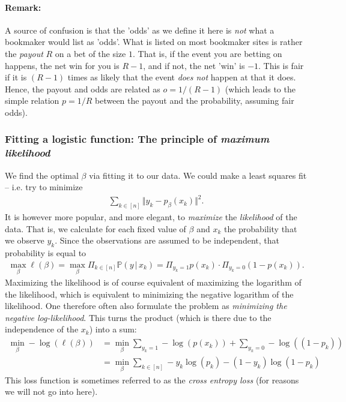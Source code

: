 \documentclass{article}
\newcommand{\norm}[1]{\Vert #1 \Vert}
\begin{document}
\paragraph{Remark:} A source of confusion is that the 'odds' as we define it here is \emph{not} what a bookmaker would list as 'odds'. What is listed on most bookmaker sites is rather the \emph{payout} $R$ on a bet of the size $1$. That is, if the event you are betting on happens, the net win for you is $R-1$, and if not, the net 'win' is $-1$. This is fair if it is $(R-1)$ times as likely that the event \emph{does not} happen at that it does. Hence, the payout and odds are related as $o=1/(R-1)$ (which leads to the simple relation $p=1/R$ between the payout and the probability, assuming fair odds).


\subsubsection{Fitting a logistic function: The principle of \emph{maximum likelihood}}
We find the optimal $\beta$ via fitting it to our data. We could make a least squares fit -- i.e. try to minimize
\begin{align*}
    \sum_{k\in [n]} \norm{y_k - p_\beta(x_k)}^2.
\end{align*}
It is however more popular, and more elegant, to \emph{maximize} the \emph{likelihood} of the data. That is, we calculate for each fixed value of $\beta$ and $x_k$ the probability that we observe $y_k$. Since the observations are assumed to be independent, that probability is equal to
\begin{align*}
    \max_\beta \ell(\beta) =  \max_\beta \Pi_{k \in [n]} \mathbb{P}(y \,\vert \, x_k) = \Pi_{y_k =1} p(x_k)\cdot \Pi_{y_k=0} (1-p(x_k)).
\end{align*}
Maximizing the likelihood is of course equivalent of maximizing the logarithm of the likelihood, which is equivalent to minimizing the negative logarithm of the likelihood. One therefore often also formulate the problem as \emph{minimizing the negative log-likelihood}. This turns the product (which is there due to the independence of the $x_k$) into a sum:
\begin{align*}
    \min_{\beta} - \log(\ell(\beta)) &= \min_\beta \sum_{y_k=1} -\log(p(x_k)) + \sum_{y_k=0} -\log((1-p_k)) \\
    &= \min_\beta \sum_{k \in [n]} -y_k\log(p_k)-(1-y_k)\log(1-p_k) 
\end{align*}
This loss function is sometimes referred to as the \emph{cross entropy loss} (for reasons we will not go into here).
\end{document}

